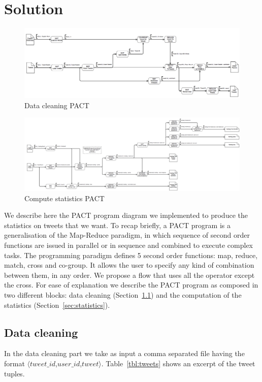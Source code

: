 \section{Solution}
\label{sec:solution}

\begin{figure}[!Ht]
\includegraphics[width=\textwidth]{images/strato_pact_pt1.png} 
\caption{Data cleaning PACT}
\label{fig:cleaning}
\end{figure}

\begin{figure}[!Ht]
\includegraphics[width=\textwidth]{images/strato_pact_pt2.png} 
\caption{Compute statistics PACT}
\label{fig:statistics}
\end{figure}

We describe here the PACT program diagram we implemented to produce the statistics on tweets that we want. 
To recap briefly, a PACT program is a generalisation of the Map-Reduce paradigm, in which sequence of second order functions are issued in parallel or in sequence and combined to execute complex tasks. 
The programming paradigm defines 5 second order functions: map, reduce, match, cross and co-group.
It allows the user to specify any kind of combination between them, in any order.
We propose a flow that uses all the operator except the cross. 
For ease of explanation we describe the PACT program as composed in two different blocks: data cleaning (Section~\ref{sec:cleaning}) and the computation of the statistics (Section~\ref{sec:statistics}).

\subsection{Data cleaning}
\label{sec:cleaning}
In the data cleaning part we take as input a comma separated file having the format $\langle tweet\_id$,$user\_id$,$tweet \rangle$. 
Table~\ref{tbl:tweets} shows an excerpt of the tweet tuples. 


